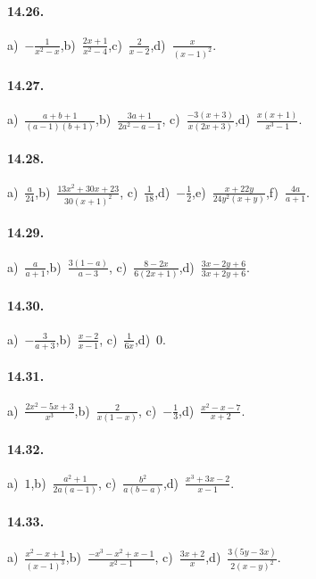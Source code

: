 \paragraph{14.26.}
a)~$-{\frac{1}{x^{2}-x}}$,\quad b)~$\frac{2x+1}{x^{2}-4}$,\quad c)~$\frac{2}{x-2}$,\quad d)~$\frac{x}{(x-1)^{2}}$.

\paragraph{14.27.}
a)~$\frac{a+b+1}{(a-1)(b+1)}$,\quad b)~$\frac{3a+1}{2a^{2}-a-1}$, \quad c)~$\frac{-3(x+3)}{x(2x+3)}$,\quad d)~$\frac{x(x+1)}{x^{3}-1}$.

\paragraph{14.28.}
a)~$\frac{a}{24}$,\quad b)~$\frac{13x^{2}+30x+23}{30(x+1)^{2}}$, \quad c)~$\frac{1}{18}$,\quad d)~$-\frac{1}{2}$,\quad e)~$\frac{x+22y}{24y^{2}(x+y)}$,\quad f)~$\frac{4a}{a+1}$.

\paragraph{14.29.}
a)~$\frac{a}{a+1}$,\quad b)~$\frac{3(1-a)}{a-3}$, \quad c)~$\frac{8-2x}{6(2x+1)}$,\quad d)~$\frac{3x-2y+6}{3x+2y+6}$.

\paragraph{14.30.}
a)~$-\frac{3}{a+3}$,\quad b)~$\frac{x-2}{x-1}$, \quad c)~$\frac{1}{6x}$,\quad d)~$0$.

\paragraph{14.31.}
a)~$\frac{2x^{2}-5x+3}{x^{3}}$,\quad b)~$\frac{2}{x(1-x)}$, \quad c)~$-{\frac{1}{3}}$,\quad d)~$\frac{x^{2}-x-7}{x+2}$.

\paragraph{14.32.}
a)~$1$,\quad b)~$\frac{a^{2}+1}{2a(a-1)}$, \quad c)~$\frac{b^{2}}{a(b-a)}$,\quad d)~$\frac{x^{3}+3x-2}{x-1}$.

\paragraph{14.33.}
a)~$\frac{x^{2}-x+1}{(x-1)^{3}}$,\quad b)~$\frac{-x^{3}-x^{2}+x-1}{x^{2}-1}$, \quad c)~$\frac{3x+2}{x}$,\quad d)~$\frac{3(5y-3x)}{2(x-y)^{2}}$.

